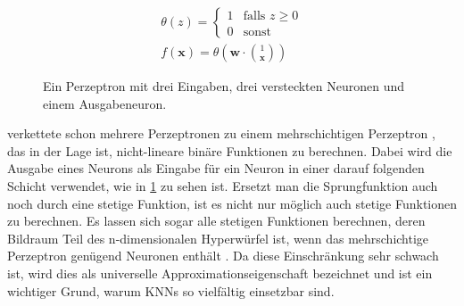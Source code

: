 $$
\begin{aligned}
    \theta (z) = \begin{cases} 1 & \text{falls } z \geq 0 \\ 0 & \text{sonst} \end{cases}
\\
f(\mathbf{x}) = \theta \left(\mathbf{w} \cdot \binom{1}{\mathbf{x}} \right)
\end{aligned}
$$

\begin{figure}
    \label{fig:perzeptron}
    \centering
    \caption{Ein Perzeptron mit drei Eingaben, drei versteckten Neuronen und einem Ausgabeneuron.}
\end{figure}

 verkettete schon mehrere Perzeptronen zu einem mehrschichtigen Perzeptron , das in der Lage ist, nicht-lineare binäre Funktionen zu berechnen.
Dabei wird die Ausgabe eines Neurons als Eingabe für ein Neuron in einer darauf folgenden Schicht verwendet, wie in \ref{fig:perzeptron} zu sehen ist.
Ersetzt man die Sprungfunktion auch noch durch eine stetige Funktion, ist es nicht nur möglich auch stetige Funktionen zu berechnen.
Es lassen sich sogar alle stetigen Funktionen berechnen, deren Bildraum Teil des n-dimensionalen Hyperwürfel ist, wenn das mehrschichtige Perzeptron genügend Neuronen enthält \cite{Cybenko1989}.
Da diese Einschränkung sehr schwach ist, wird dies als universelle Approximationseigenschaft bezeichnet und ist ein wichtiger Grund, warum KNNs so vielfältig einsetzbar sind.


